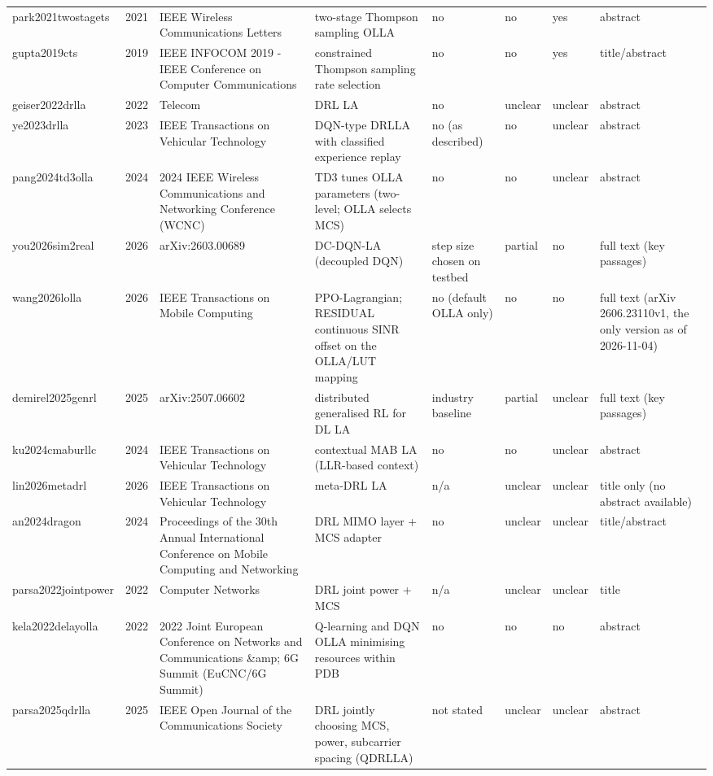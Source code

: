 \documentclass[10pt]{article}
\begin{document}
\begin{landscape}
\begin{longtable}{@{}llllllll@{}}
park2021twostagets & 2021 & IEEE Wireless Communications Letters & two-stage Thompson sampling OLLA & no & no & yes & abstract \\
gupta2019cts & 2019 & IEEE INFOCOM 2019 - IEEE Conference on Computer Communications & constrained Thompson sampling rate selection & no & no & yes & title/abstract \\
geiser2022drlla & 2022 & Telecom & DRL LA & no & unclear & unclear & abstract \\
ye2023drlla & 2023 & IEEE Transactions on Vehicular Technology & DQN-type DRLLA with classified experience replay & no (as described) & no & unclear & abstract \\
pang2024td3olla & 2024 & 2024 IEEE Wireless Communications and Networking Conference (WCNC) & TD3 tunes OLLA parameters (two-level; OLLA selects MCS) & no & no & unclear & abstract \\
you2026sim2real & 2026 & arXiv:2603.00689 & DC-DQN-LA (decoupled DQN) & step size chosen on testbed & partial & no & full text (key passages) \\
wang2026lolla & 2026 & IEEE Transactions on Mobile Computing & PPO-Lagrangian; RESIDUAL continuous SINR offset on the OLLA/LUT mapping & no (default OLLA only) & no & no & full text (arXiv 2606.23110v1, the only version as of 2026-11-04) \\
demirel2025genrl & 2025 & arXiv:2507.06602 & distributed generalised RL for DL LA & industry baseline & partial & unclear & full text (key passages) \\
ku2024cmaburllc & 2024 & IEEE Transactions on Vehicular Technology & contextual MAB LA (LLR-based context) & no & no & unclear & abstract \\
lin2026metadrl & 2026 & IEEE Transactions on Vehicular Technology & meta-DRL LA & n/a & unclear & unclear & title only (no abstract available) \\
an2024dragon & 2024 & Proceedings of the 30th Annual International Conference on Mobile Computing and Networking & DRL MIMO layer + MCS adapter & no & unclear & unclear & title/abstract \\
parsa2022jointpower & 2022 & Computer Networks & DRL joint power + MCS & n/a & unclear & unclear & title \\
kela2022delayolla & 2022 & 2022 Joint European Conference on Networks and Communications \&amp; 6G Summit (EuCNC/6G Summit) & Q-learning and DQN OLLA minimising resources within PDB & no & no & no & abstract \\
parsa2025qdrlla & 2025 & IEEE Open Journal of the Communications Society & DRL jointly choosing MCS, power, subcarrier spacing (QDRLLA) & not stated & unclear & unclear & abstract \\

\end{longtable}
\end{landscape}
\end{document}
